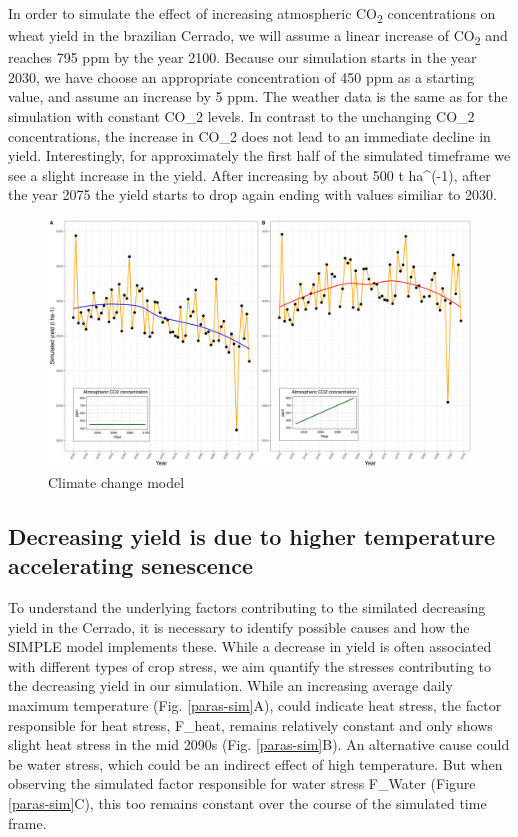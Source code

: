 \documentclass[11pt]{article}
\begin{document}
In order to simulate the effect of increasing atmospheric CO\textsubscript{2} concentrations on wheat yield in the brazilian Cerrado, we will assume a linear increase of CO\textsubscript{2} and reaches 795 ppm by the year 2100. Because our simulation starts in the year 2030, we have choose an appropriate concentration of 450 ppm as a starting value, and assume an increase by 5 ppm. The weather data is the same as for the simulation with constant CO\_2 levels. In contrast to the unchanging CO\_2 concentrations, the increase in CO\_2 does not lead to an immediate decline in yield. Interestingly, for approximately the first half of the simulated timeframe we see a slight increase in the yield. After increasing by about 500 t ha\^{}(-1), after the year 2075 the yield starts to drop again ending with values similiar to 2030.

\begin{figure}[htbp]
\centering
\includegraphics[width=1\textwidth]{../results/cc-model/2023-02-21_yield_prediction_cc_model_CO2_with_conc.png}
\caption{\label{cc-model}Climate change model}
\end{figure}


\subsection{Decreasing yield is due to higher temperature accelerating senescence}
\label{sec:org3a65166}
To understand the underlying factors contributing to the similated decreasing yield in the Cerrado, it is necessary to identify possible causes and how the SIMPLE model implements these. While a decrease in yield is often associated with different types of crop stress, we aim quantify the stresses contributing to the decreasing yield in our simulation. While an increasing average daily maximum temperature (Fig. \ref{paras-sim}A), could indicate heat stress, the factor responsible for heat stress, F\_heat, remains relatively constant and only shows slight heat stress in the mid 2090s (Fig. \ref{paras-sim}B). An alternative cause could be water stress, which could be an indirect effect of high temperature. But when observing the simulated factor responsible for water stress F\_Water (Figure \ref{paras-sim}C), this too remains constant over the course of the simulated time frame.
\end{document}
